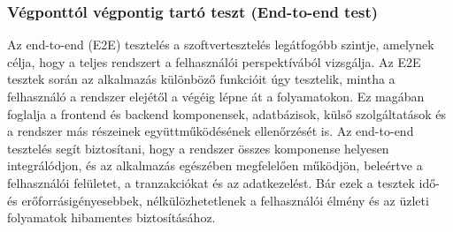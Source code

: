 \subsubsection{Végponttól végpontig tartó teszt (End-to-end test)}
Az end-to-end (E2E) tesztelés a szoftvertesztelés legátfogóbb szintje, amelynek célja, hogy a teljes rendszert a felhasználói perspektívából vizsgálja.
Az E2E tesztek során az alkalmazás különböző funkcióit úgy tesztelik, mintha a felhasználó a rendszer elejétől a végéig lépne át a folyamatokon.
Ez magában foglalja a frontend és backend komponensek, adatbázisok, külső szolgáltatások és a rendszer más részeinek együttműködésének ellenőrzését is.
Az end-to-end tesztelés segít biztosítani, hogy a rendszer összes komponense helyesen integrálódjon, és az alkalmazás egészében megfelelően működjön, beleértve a felhasználói felületet, a tranzakciókat és az adatkezelést.
Bár ezek a tesztek idő- és erőforrásigényesebbek, nélkülözhetetlenek a felhasználói élmény és az üzleti folyamatok hibamentes biztosításához.